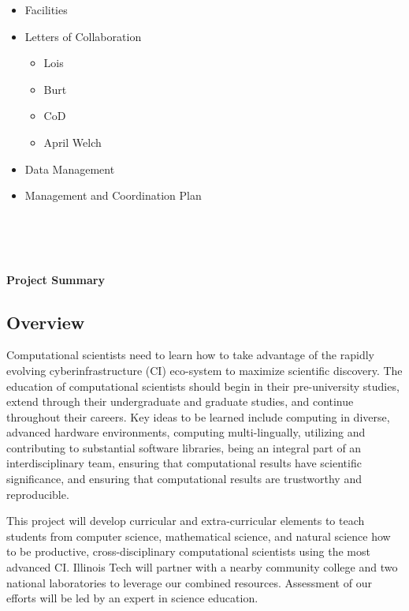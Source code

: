 \documentclass[11pt]{NSFamsart}
\newcommand{\done}{\textcolor{green}{\checkmark}}
\begin{document}
\begin{itemize}
\item[\done] Facilities

\item[\done] Letters of Collaboration
\begin{itemize}
\item[\done] Lois
\item[\done] Burt
\item[\done] CoD
\item[\done] April Welch
\end{itemize}

\item[\done] Data Management

\item[\done] Management and Coordination Plan

\end{itemize}

\bigskip

\noindent
{}\qquad
{} \qquad
{} \\
 \qquad
{}\\
\\

\newpage \setcounter{page}{1} %

\centerline{\Large \textbf{Project Summary}} \hypertarget{ProjSumm}{}
\subsection*{Overview}
Computational scientists need to learn how to take advantage of the rapidly evolving cyberinfrastructure (CI) eco-system to maximize scientific discovery. The education of computational scientists should begin in their pre-university studies,  extend through their undergraduate and graduate studies, and continue throughout their careers. Key ideas to be learned include computing in diverse, advanced hardware environments, computing multi-lingually, utilizing and contributing to substantial software libraries, being an integral part of an interdisciplinary team, ensuring that computational results have scientific significance, and ensuring that computational results are trustworthy and reproducible.  

This project will develop curricular and extra-curricular elements to teach students from computer science, mathematical science, and natural science how to be productive, cross-disciplinary computational scientists using the most advanced CI. Illinois Tech will partner with a nearby community college and two national laboratories to leverage our combined resources. Assessment of our efforts will be led by an expert in science education.
\end{document}

